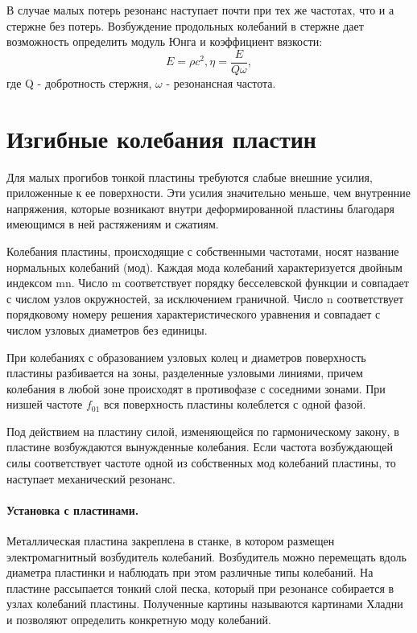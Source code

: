 В случае малых потерь резонанс наступает почти при тех же частотах, что и а стержне без потерь. Возбуждение продольных колебаний в стержне дает возможность определить модуль Юнга и коэффициент вязкости:
\begin{equation}
	E=\rho c^2, \eta = \frac{E}{Q\omega},
\end{equation}
где Q - добротность стержня, $\omega$ - резонансная частота. 

\section*{Изгибные колебания пластин}
Для малых прогибов тонкой пластины требуются слабые внешние усилия, приложенные к ее поверхности. Эти усилия значительно меньше, чем внутренние напряжения, которые возникают внутри деформированной пластины благодаря имеющимся в ней растяжениям и сжатиям. 

Колебания пластины, происходящие с собственными частотами, носят название нормальных колебаний (мод). Каждая мода колебаний характеризуется двойным индексом mn. Число m соответствует порядку бесселевской функции и совпадает с числом узлов окружностей, за исключением граничной. Число n соответствует порядковому номеру решения характеристического уравнения и совпадает с числом узловых диаметров без единицы. 

При колебаниях с образованием узловых колец и диаметров поверхность пластины разбивается на зоны, разделенные узловыми линиями, причем колебания в любой зоне происходят в противофазе с соседними зонами. При низшей частоте $f_{01}$ вся поверхность пластины колеблется с одной фазой. 

Под действием на пластину силой, изменяющейся по гармоническому закону, в пластине возбуждаются вынужденные колебания. Если частота возбуждающей силы соответствует частоте одной из собственных мод колебаний пластины, то наступает механический резонанс. 

\paragraph{Установка с пластинами.} Металлическая пластина закреплена в станке, в котором размещен электромагнитный возбудитель колебаний. Возбудитель можно перемещать вдоль диаметра пластинки и наблюдать при этом различные типы колебаний. На пластине рассыпается тонкий слой песка, который при резонансе собирается в узлах колебаний пластины. Полученные картины называются картинами Хладни и позволяют определить конкретную моду колебаний.

